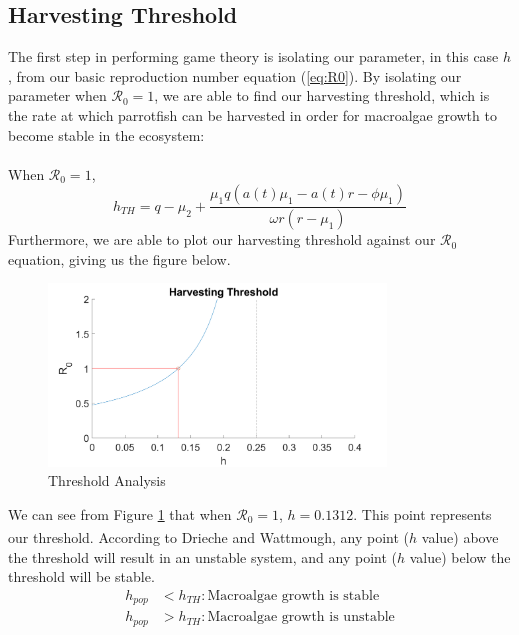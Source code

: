 \documentclass[12pt]{article}
\begin{document}
\subsection{Harvesting Threshold}
The first step in performing game theory is isolating our parameter, in this case $h$, from our basic reproduction number equation (\ref{eq:R0}). By isolating our parameter when $\mathscr{R}_0 = 1$, we are able to find our harvesting threshold, which is the rate at which parrotfish can be harvested in order for macroalgae growth to become stable in the ecosystem:\\
\\
When $\mathscr{R}_{0} = 1$,
\begin{equation}\label{eq:h_TH}
    \displaystyle{h_{TH} = q - \mu_{2} + \frac{\mu_{1}q(a(t) \mu_{1} - a(t)r - \phi \mu_{1})}{\omega r(r-\mu_{1})}}
\end{equation}
Furthermore, we are able to plot our harvesting threshold against our $\mathscr{R}_{0}$ equation, giving us the figure below.
\begin{figure}[H]
    \centering
    \includegraphics[width=0.8\textwidth]{Latex/Figures/Graphs/threshold_graph.png}
    \caption{Threshold Analysis}
    \label{fig:threshold_graph}
\end{figure}
We can see from Figure \ref{fig:threshold_graph} that when $\mathscr{R}_{0} = 1$, $h=0.1312$. This point represents our threshold. According to Drieche and Wattmough\textsuperscript{\cite{bible}}, any point ($h$ value) above the threshold will result in an unstable system, and any point ($h$ value) below the threshold will be stable.
\begin{align*}
    h_{pop} &< h_{TH}: \text{Macroalgae growth is stable} \\
    h_{pop} &> h_{TH}: \text{Macroalgae growth is unstable}
\end{align*}
\end{document}
